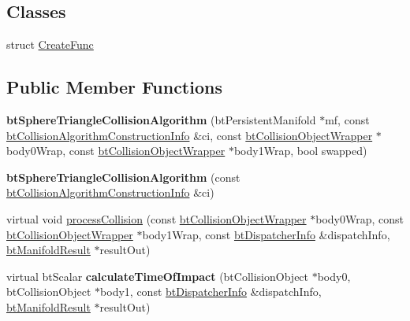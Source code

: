 \subsection*{Classes}
\begin{DoxyCompactItemize}
\item 
struct \hyperlink{structbtSphereTriangleCollisionAlgorithm_1_1CreateFunc}{Create\+Func}
\end{DoxyCompactItemize}
\subsection*{Public Member Functions}
\begin{DoxyCompactItemize}
\item 
\mbox{\label{classbtSphereTriangleCollisionAlgorithm_a278144bf8f19f8d1873ef2c9f6c6667c}} 
{\bfseries bt\+Sphere\+Triangle\+Collision\+Algorithm} (bt\+Persistent\+Manifold $\ast$mf, const \hyperlink{structbtCollisionAlgorithmConstructionInfo}{bt\+Collision\+Algorithm\+Construction\+Info} \&ci, const \hyperlink{structbtCollisionObjectWrapper}{bt\+Collision\+Object\+Wrapper} $\ast$body0\+Wrap, const \hyperlink{structbtCollisionObjectWrapper}{bt\+Collision\+Object\+Wrapper} $\ast$body1\+Wrap, bool swapped)
\item 
\mbox{\label{classbtSphereTriangleCollisionAlgorithm_ad21f16e3d6cd90274a39f34e8feef9bf}} 
{\bfseries bt\+Sphere\+Triangle\+Collision\+Algorithm} (const \hyperlink{structbtCollisionAlgorithmConstructionInfo}{bt\+Collision\+Algorithm\+Construction\+Info} \&ci)
\item 
virtual void \hyperlink{classbtSphereTriangleCollisionAlgorithm_af6de517d0a45abb91df4f61c5867c8f1}{process\+Collision} (const \hyperlink{structbtCollisionObjectWrapper}{bt\+Collision\+Object\+Wrapper} $\ast$body0\+Wrap, const \hyperlink{structbtCollisionObjectWrapper}{bt\+Collision\+Object\+Wrapper} $\ast$body1\+Wrap, const \hyperlink{structbtDispatcherInfo}{bt\+Dispatcher\+Info} \&dispatch\+Info, \hyperlink{classbtManifoldResult}{bt\+Manifold\+Result} $\ast$result\+Out)
\item 
\mbox{\label{classbtSphereTriangleCollisionAlgorithm_a28edb37215536a08a99371e72b86f182}} 
virtual bt\+Scalar {\bfseries calculate\+Time\+Of\+Impact} (bt\+Collision\+Object $\ast$body0, bt\+Collision\+Object $\ast$body1, const \hyperlink{structbtDispatcherInfo}{bt\+Dispatcher\+Info} \&dispatch\+Info, \hyperlink{classbtManifoldResult}{bt\+Manifold\+Result} $\ast$result\+Out)

\end{DoxyCompactItemize}

